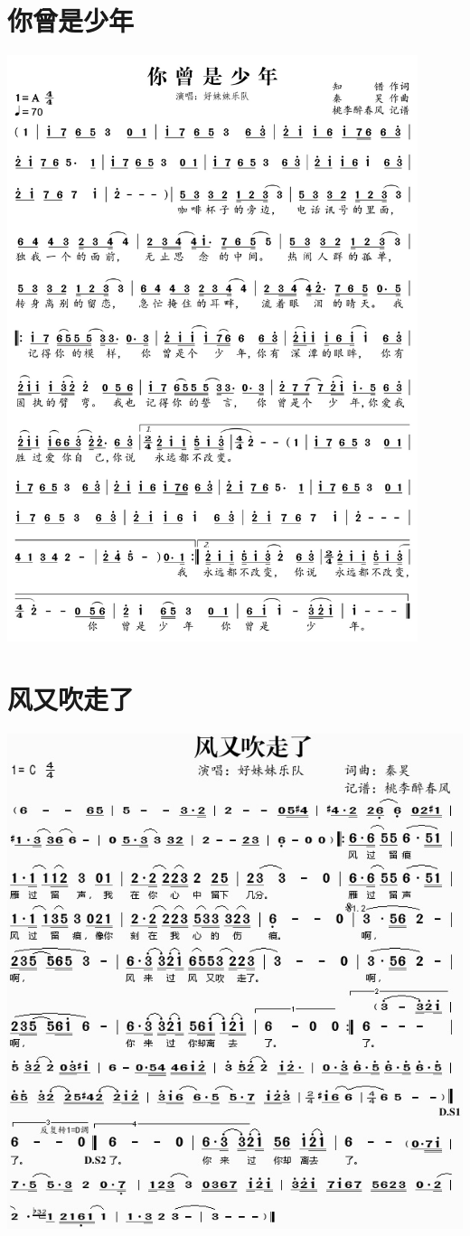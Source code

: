 \documentclass[cn,pad,twocol]{elegantbook}
\begin{document}
\section{你曾是少年}  \includegraphics[width=0.9\textwidth]{dongxiao/20200516-好妹妹-你曾是少年.jpg} 
\section{风又吹走了}  \includegraphics[width=\textwidth]{dongxiao/20200516-好妹妹-风又吹走了.jpg} 
\end{document}
